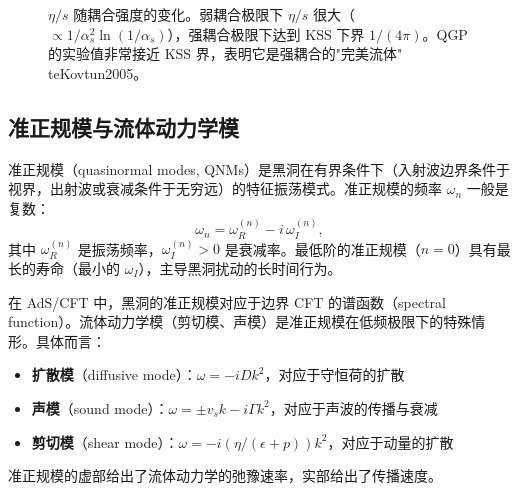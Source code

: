 \begin{figure}[htbp]
\centering
{}
\caption{$\eta/s$ 随耦合强度的变化。弱耦合极限下 $\eta/s$ 很大（$\propto 1/\alpha_s^2 \ln(1/\alpha_s)$），强耦合极限下达到 KSS 下界 $1/(4\pi)$。QGP 的实验值非常接近 KSS 界，表明它是强耦合的"完美流体" 	te{Kovtun2005}。}
\label{fig:eta-s-bound}
\end{figure}

\subsection{准正规模与流体动力学模}

\begin{definition}[准正规模]\label{def:QNM}
准正规模（quasinormal modes, QNMs）是黑洞在有界条件下（入射波边界条件于视界，出射波或衰减条件于无穷远）的特征振荡模式。准正规模的频率 $\omega_n$ 一般是复数：
\begin{equation}\label{eq:QNM-frequency}
    \omega_n = \omega_R^{(n)} - i\,\omega_I^{(n)},
\end{equation}
其中 $\omega_R^{(n)}$ 是振荡频率，$\omega_I^{(n)} > 0$ 是衰减率。最低阶的准正规模（$n=0$）具有最长的寿命（最小的 $\omega_I$），主导黑洞扰动的长时间行为。
\end{definition}

\begin{note}[准正规模与全息对应]
在 AdS/CFT 中，黑洞的准正规模对应于边界 CFT 的谱函数（spectral function）。流体动力学模（剪切模、声模）是准正规模在低频极限下的特殊情形。具体而言：
\begin{itemize}
    \item \textbf{扩散模}（diffusive mode）：$\omega = -iDk^2$，对应于守恒荷的扩散
    \item \textbf{声模}（sound mode）：$\omega = \pm v_s k - i\Gamma k^2$，对应于声波的传播与衰减
    \item \textbf{剪切模}（shear mode）：$\omega = -i(\eta/(\epsilon+p))k^2$，对应于动量的扩散
\end{itemize}
准正规模的虚部给出了流体动力学的弛豫速率，实部给出了传播速度。
\end{note}

